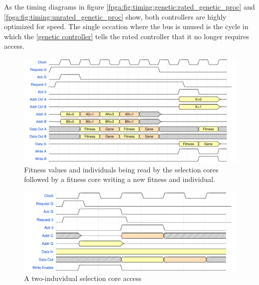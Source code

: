 As the timing diagrams in figure \vref{fpga:fig:timing:genetic:rated_genetic_proc} and \vref{fpga:fig:timing:unrated_genetic_proc} show, both controllers are highly optimized for speed. The single occation where the bus is unused is the cycle in which the \ref{genetic controller} tells the \gls{rated controller} that it no longer requires access.

\begin{figure}[H]
  \centering
  \includegraphics[width=\textwidth]{fpga/fig/timing/rated_genetic_proc.pdf}
  \caption{Fitness values and individuals being read by the selection cores followed by a fitness core writing a new fitness and individual.}
  \label{fpga:fig:timing:genetic:rated_genetic_proc}
\end{figure}

\begin{figure}[H]
  \centering
  \includegraphics[width=\textwidth]{fpga/fig/timing/unrated_genetic_proc.pdf}
  \caption{A two-induvidual selection core access }
  \label{fpga:fig:timing:genetic:unrated_genetic_proc}
\end{figure}

